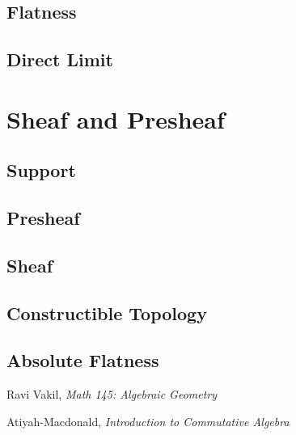 \documentclass[]{report}
\begin{document}
\section{Flatness}
\section{Direct Limit}

\chapter{Sheaf and Presheaf}
\section{Support}
\section{Presheaf}
\section{Sheaf}
\section{Constructible Topology}
\section{Absolute Flatness}

\begin{thebibliography}{9}

    Ravi Vakil,
    \textit{Math 145: Algebraic Geometry}

    Atiyah-Macdonald, 
    \textit{Introduction to Commutative Algebra}
\end{thebibliography}
\end{document}
